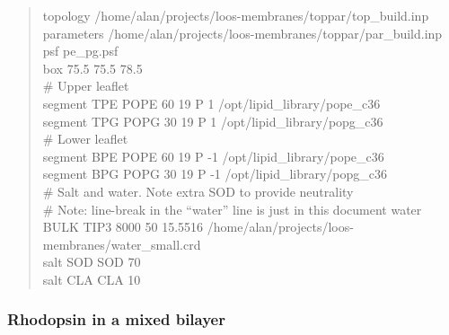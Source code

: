 \documentclass[12pt]{article}
\begin{document}
\begin{quote}
topology /home/alan/projects/loos-membranes/toppar/top\_build.inp \\
parameters /home/alan/projects/loos-membranes/toppar/par\_build.inp \\
psf      pe\_pg.psf \\
box      75.5  75.5  78.5 \\

\# Upper leaflet \\
segment TPE       POPE     60    19    P 1      /opt/lipid\_library/pope\_c36 \\
segment TPG       POPG     30    19    P 1      /opt/lipid\_library/popg\_c36 \\

\# Lower leaflet \\
segment BPE       POPE     60    19   P -1      /opt/lipid\_library/pope\_c36 \\
segment BPG       POPG     30    19   P -1      /opt/lipid\_library/popg\_c36 \\

\# Salt and water.  Note extra SOD to provide neutrality \\
\# Note: line-break in the ``water'' line is just in this document
water   BULK     TIP3      8000       50      15.5516 /home/alan/projects/loos-membranes/water\_small.crd \\
salt    SOD       SOD      70 \\
salt    CLA       CLA      10 \\

\end{quote}

\subsubsection{Rhodopsin in a mixed bilayer}
\end{document}
